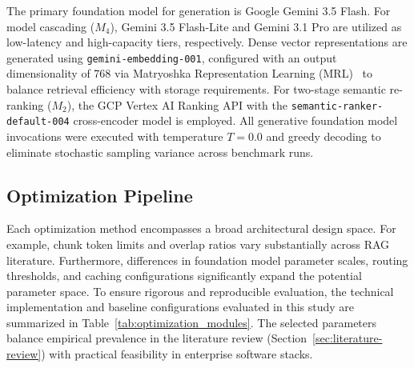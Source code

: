 The primary foundation model for generation is Google Gemini 3.5 Flash. For model cascading ($M_4$), Gemini 3.5 Flash-Lite and Gemini 3.1 Pro are utilized as low-latency and high-capacity tiers, respectively. Dense vector representations are generated using \texttt{gemini-embedding-001}, configured with an output dimensionality of 768 via Matryoshka Representation Learning (MRL)~\citep{MRL2022} to balance retrieval efficiency with storage requirements. For two-stage semantic re-ranking ($M_2$), the GCP Vertex AI Ranking API with the \texttt{semantic-ranker-default-004} cross-encoder model is employed. All generative foundation model invocations were executed with temperature $T = 0.0$ and greedy decoding to eliminate stochastic sampling variance across benchmark runs.

\subsection{Optimization Pipeline}
\label{subsec:opt_pipeline}

Each optimization method encompasses a broad architectural design space. For example, chunk token limits and overlap ratios vary substantially across RAG literature. Furthermore, differences in foundation model parameter scales, routing thresholds, and caching configurations significantly expand the potential parameter space. To ensure rigorous and reproducible evaluation, the technical implementation and baseline configurations evaluated in this study are summarized in Table~\ref{tab:optimization_modules}. The selected parameters balance empirical prevalence in the literature review (Section~\ref{sec:literature-review}) with practical feasibility in enterprise software stacks.


